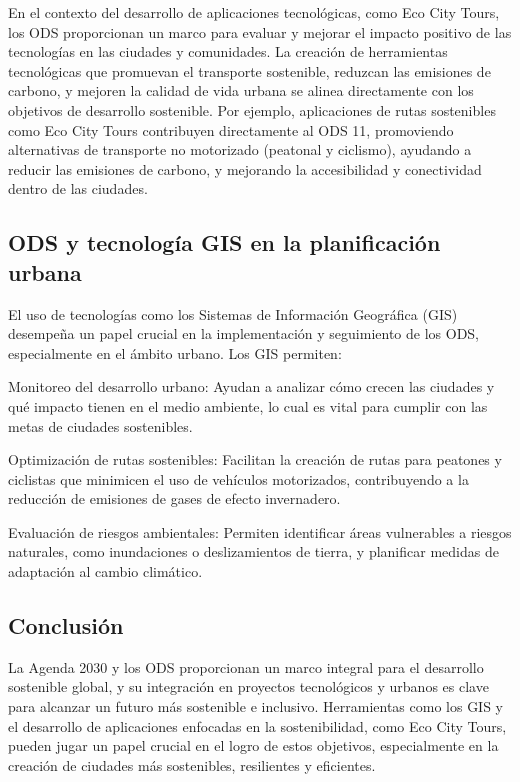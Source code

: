 	En el contexto del desarrollo de aplicaciones tecnológicas, como Eco City Tours, los ODS proporcionan un marco para evaluar y mejorar el impacto positivo de las tecnologías en las ciudades y comunidades. La creación de herramientas tecnológicas que promuevan el transporte sostenible, reduzcan las emisiones de carbono, y mejoren la calidad de vida urbana se alinea directamente con los objetivos de desarrollo sostenible. Por ejemplo, aplicaciones de rutas sostenibles como Eco City Tours contribuyen directamente al ODS 11, promoviendo alternativas de transporte no motorizado (peatonal y ciclismo), ayudando a reducir las emisiones de carbono, y mejorando la accesibilidad y conectividad dentro de las ciudades.
	
	\subsection{ODS y tecnología GIS en la planificación urbana}
	
	El uso de tecnologías como los Sistemas de Información Geográfica (GIS) desempeña un papel crucial en la implementación y seguimiento de los ODS, especialmente en el ámbito urbano. Los GIS permiten:
	
	Monitoreo del desarrollo urbano: Ayudan a analizar cómo crecen las ciudades y qué impacto tienen en el medio ambiente, lo cual es vital para cumplir con las metas de ciudades sostenibles.
	
	Optimización de rutas sostenibles: Facilitan la creación de rutas para peatones y ciclistas que minimicen el uso de vehículos motorizados, contribuyendo a la reducción de emisiones de gases de efecto invernadero.
	
	Evaluación de riesgos ambientales: Permiten identificar áreas vulnerables a riesgos naturales, como inundaciones o deslizamientos de tierra, y planificar medidas de adaptación al cambio climático.
	
	\subsection{Conclusión}
	
	La Agenda 2030 y los ODS proporcionan un marco integral para el desarrollo sostenible global, y su integración en proyectos tecnológicos y urbanos es clave para alcanzar un futuro más sostenible e inclusivo. Herramientas como los GIS y el desarrollo de aplicaciones enfocadas en la sostenibilidad, como Eco City Tours, pueden jugar un papel crucial en el logro de estos objetivos, especialmente en la creación de ciudades más sostenibles, resilientes y eficientes.

